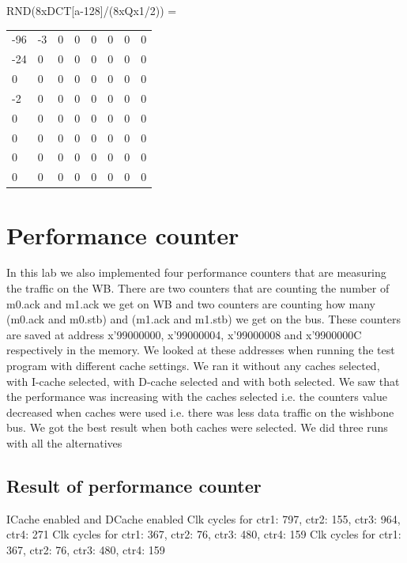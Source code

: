 \documentclass[a4paper]{article}
\begin{document}
RND(8xDCT[a-128]/(8xQx1/2)) =  \newline  \newline
\begin{tabular}{l l l l l l l l}
  -96   &  -3   &   0   &   0  &    0  &    0   &   0 &     0 \\
  -24    &  0    &  0   &   0   &   0   &   0   &   0   &   0 \\
    0    &  0   &   0   &   0   &   0   &   0    &  0   &   0 \\
   -2    &  0   &   0    &  0   &   0   &   0    &  0   &   0 \\
    0    &  0    &  0    &  0   &   0   &   0  &    0   &   0 \\
    0    &  0   &   0    &  0   &   0   &   0    &  0    &   0 \\
    0    &  0   &   0    &  0   &   0   &   0    &  0     & 0 \\
    0    &  0   &   0   &   0   &   0   &   0   &   0     & 0 \\

\end{tabular}


\section{Performance counter}

In this lab we also implemented four performance counters that are measuring the traffic on the WB. There are two counters that are counting the number of m0.ack and m1.ack we get on WB and two counters are counting how many (m0.ack and m0.stb) and (m1.ack and m1.stb) we get on the bus. These counters are saved at address x’99000000, x’99000004, x’99000008 and x’9900000C respectively in the memory.
We looked at these addresses when running the test program with different cache settings. We ran it without any caches selected, with I-cache selected, with D-cache selected and with both selected.  We saw that the performance was increasing with the caches selected i.e. the counters value decreased when caches were used i.e. there was less data traffic on the wishbone bus. We got the best result when both caches were selected. We did three runs with all the alternatives


\subsection{Result of performance counter}

ICache enabled and DCache enabled \newline 
Clk cycles for ctr1: 797, ctr2: 155, ctr3: 964, ctr4: 271  \newline
Clk cycles for ctr1: 367, ctr2:  76, ctr3: 480, ctr4: 159 \newline
Clk cycles for ctr1: 367, ctr2:  76, ctr3: 480, ctr4: 159 \newline  \newline
\end{document}
